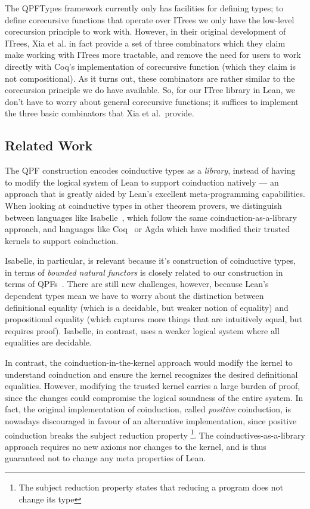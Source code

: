 \documentclass[a4paper]{scrartcl}
\begin{document}
The QPFTypes framework currently only has facilities for defining types;
to define corecursive functions that operate over ITrees we only have
the low-level corecursion principle to work with. However, in their
original development of ITrees, Xia et al. in fact provide a set of three
combinators which they claim make working with ITrees more tractable,
and remove the need for users to work directly with Coq's implementation
of corecursive function (which they claim is not compositional). As it
turns out, these combinators are rather similar to the corecursion
principle we do have available. So, for our ITree library
in Lean, we don't have to worry about general corecursive functions; it
suffices to implement the three basic combinators that Xia et
al.~provide.

\subsection{Related Work}\label{related-work-1}

The QPF construction encodes coinductive types as a \emph{library},
instead of having to modify the logical system of Lean to support
coinduction natively --- an approach that is greatly aided by Lean's
excellent meta-programming capabilities. When looking at coinductive
types in other theorem provers, we distinguish between languages like
Isabelle~\cite{traytelCategoryTheoryBased}, which follow the same
coinduction-as-a-library approach, and languages like Coq~\cite{gimenezTutorialRecursiveTypes1998, gimenezApplicationCoinductiveTypes1996}
or Agda which have modified their trusted kernels to support
coinduction.

Isabelle, in particular, is relevant because it's construction of
coinductive types, in terms of \emph{bounded natural functors} is
closely related to our construction in terms of QPFs~\cite{furerQuotientsBoundedNatural2022}. There are still new
challenges, however, because Lean's dependent types mean we have to
worry about the distinction between definitional equality (which is a
decidable, but weaker notion of equality) and propositional equality
(which captures more things that are intuitively equal, but requires
proof). Isabelle, in contrast, uses a weaker logical system where all
equalities are decidable.

In contrast, the coinduction-in-the-kernel approach would modify the
kernel to understand coinduction and ensure the kernel recognizes the
desired definitional equalities. However, modifying the trusted kernel
carries a large burden of proof, since the changes could compromise the
logical soundness of the entire system. In fact, the original
implementation of coinduction, called \emph{positive} coinduction, is
nowadays discouraged in favour of an alternative implementation, since
positive coinduction breaks the subject reduction property
\footnote{The subject reduction property states that reducing a program
  does not change its type}\cite{sozeauCorrectCompleteType}. The
coinductives-as-a-library approach requires no new axioms nor changes to
the kernel, and is thus guaranteed not to change any meta properties of
Lean.
\end{document}
